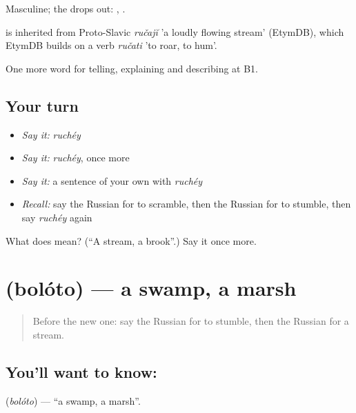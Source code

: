 Masculine; the  drops out: \emph{}, \emph{}.

\begin{cousinweb}
\emph{} is inherited from Proto-Slavic \emph{ručajĭ} 'a loudly flowing stream' (EtymDB), which EtymDB builds on a verb \emph{ručati} 'to roar, to hum'.
\end{cousinweb}

\begin{grammarlens}[title={What you've built}]
One more word for telling, explaining and describing at B1.
\end{grammarlens}

\subsection*{Your turn}
\begin{itemize}
\raggedright
  \item \emph{Say it:} \emph{ruchéy}
  \item \emph{Say it:} \emph{ruchéy}, once more
  \item \emph{Say it:} a sentence of your own with \emph{ruchéy}
  \item \emph{Recall:} say the Russian for to scramble, then the Russian for to stumble, then say \emph{ruchéy} again
\end{itemize}

\begin{tcolorbox}[breakable,colback=teal!4,colframe=teal!35!black,title={Before you move on}]
What does  mean? (\textquotedblleft{}A stream, a brook\textquotedblright{}.) Say it once more.
\end{tcolorbox}
\section[\texorpdfstring{\ru{болото} (bolóto)}{болото (bolóto)}]{ (bolóto) — a swamp, a marsh}

\label{lesson:RU-C460-boloto}



\begin{quote}
Before the new one: say the Russian for to stumble, then the Russian for a stream.
\end{quote}

\subsection*{You'll want to know: }
\textbf{} (\emph{bolóto}) — \textquotedblleft{}a swamp, a marsh\textquotedblright{}.

